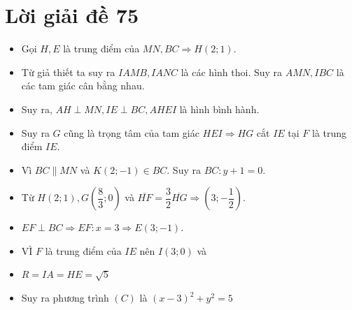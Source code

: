 \section{Lời giải đề 75}
 \lgi 
 \begin{minipage}{10cm}
\begin{itemize}[label=,leftmargin=*]
\item Gọi $H,E$ là trung điểm của $MN,BC \Rightarrow H(2;1).$	
\item Từ giả thiết ta suy ra $IAMB,IANC$ là các hình thoi. Suy ra $AMN,IBC$ là các tam giác cân bằng nhau.
\item Suy ra, $AH \perp MN, IE \perp BC, AHEI$ là hình bình hành.
\item Suy ra $G$ cũng là trọng tâm của tam giác $HEI \Rightarrow HG$ cắt $IE$ tại $F$ là trung điểm $IE$.
\item Vì $BC \parallel MN$ và $K(2;-1) \in BC$. Suy ra $BC: y+1=0.$
\item Từ $H(2;1), G\left(\dfrac{8}{3};0\right)$ và $\overline{HF}=\dfrac{3}{2}\overline{HG} \Rightarrow  \left(3;-\dfrac{1}{2}\right)$.
\item $EF \perp BC \Rightarrow EF: x=3
\Rightarrow E(3;-1).$
\item VÌ $F$ là trung điểm của $IE$ nên $I(3;0)$ và 
\item $R=IA=HE=\sqrt{5}$
\item Suy ra phương trình $(C)$ là $(x-3)^2+y^2=5$
\end{itemize}
\end{minipage}

